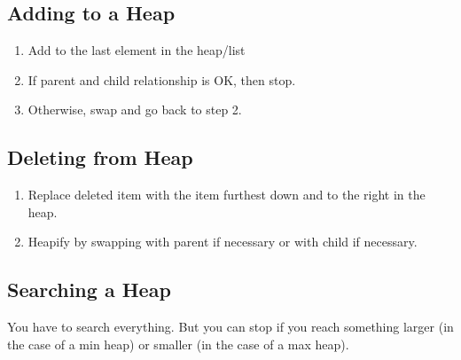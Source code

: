 \documentclass[a4paper,12pt]{report}
\begin{document}
\subsection{Adding to a Heap}
\begin{enumerate}
\item Add to the last element in the heap/list
\item If parent and child relationship is OK, then stop.
\item Otherwise, swap and go back to step 2.
\end{enumerate}

\subsection{Deleting from Heap}
\begin{enumerate}
\item Replace deleted item with the item furthest down and to the right in the heap.
\item Heapify by swapping with parent if necessary or with child if necessary.
\end{enumerate}

\subsection{Searching a Heap}
You have to search everything. But you can stop if you reach something larger (in the case of a min heap) or smaller (in the case of a max heap). 
\end{document}
